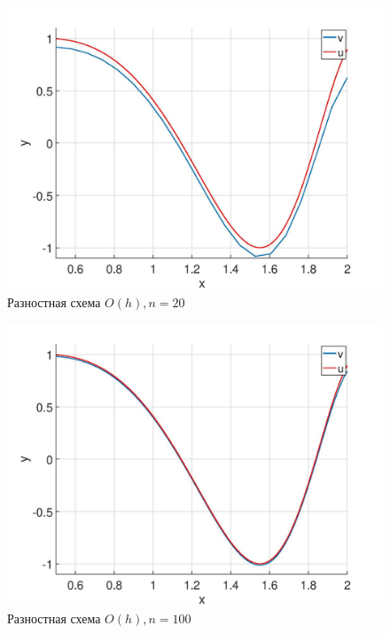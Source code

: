 \documentclass[12pt]{article}
\begin{document}
\begin{figure}
\begin{center}
\includegraphics[scale = 0.6]{h1_20.jpg} 
\end{center}
\caption{Разностная схема $O(h), n = 20$ }
\end{figure}

\begin{figure}
\begin{center}
\includegraphics[scale = 0.6]{h1_100.jpg} 
\end{center}
\caption{Разностная схема $O(h), n = 100$}
\end{figure}


\pagebreak
\end{document}

